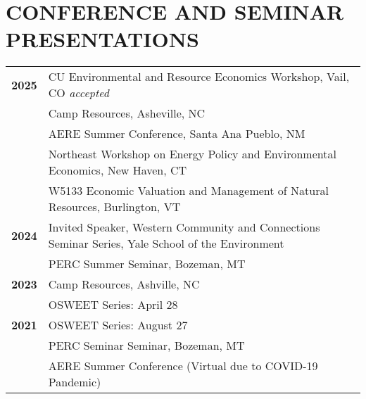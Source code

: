 \documentclass[11pt]{article}
\begin{document}
\section*{CONFERENCE AND SEMINAR PRESENTATIONS}
\begin{longtable}{>{\bfseries}r p{5.5in}}%
2025 & CU Environmental and Resource Economics Workshop, Vail, CO \textit{accepted} \\  
    & Camp Resources, Asheville, NC \\ 
    & AERE Summer Conference, Santa Ana Pueblo, NM \\ 
    & Northeast Workshop on Energy Policy and Environmental Economics, New Haven, CT \\
    & W5133	Economic Valuation and Management of Natural Resources, Burlington, VT \\
2024 & Invited Speaker, Western Community and Connections Seminar Series, Yale School of the Environment \\
    & PERC Summer Seminar, Bozeman, MT \\
2023 & Camp Resources, Ashville, NC \\
    & OSWEET Series: April 28 \\
2021 & OSWEET Series: August 27 \\
    & PERC Seminar Seminar, Bozeman, MT \\
    & AERE Summer Conference (Virtual due to COVID-19 Pandemic) \\
\end{longtable}
\end{document}
